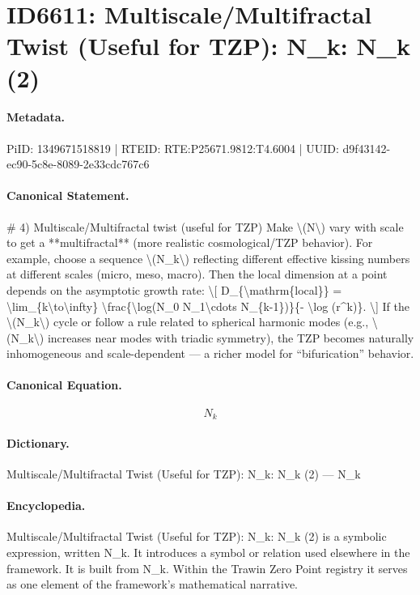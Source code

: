 \section*{ID6611: Multiscale/Multifractal Twist (Useful for TZP): N\_k: N\_k (2)}
\paragraph{Metadata.}
PiID: 1349671518819 | RTEID: RTE:P25671.9812:T4.6004 | UUID: d9f43142-ec90-5c8e-8089-2e33cdc767c6

\paragraph{Canonical Statement.}
\# 4) Multiscale/Multifractal twist (useful for TZP) Make \textbackslash{}(N\textbackslash{}) vary with scale to get a **multifractal** (more realistic cosmological/TZP behavior). For example, choose a sequence \textbackslash{}(N\_k\textbackslash{}) reflecting different effective kissing numbers at different scales (micro, meso, macro). Then the local dimension at a point depends on the asymptotic growth rate: \textbackslash{}[ D\_\{\textbackslash{}mathrm\{local\}\} = \textbackslash{}lim\_\{k\textbackslash{}to\textbackslash{}infty\} \textbackslash{}frac\{\textbackslash{}log(N\_0 N\_1\textbackslash{}cdots N\_\{k-1\})\}\{- \textbackslash{}log (r\textasciicircum{}k)\}. \textbackslash{}] If the \textbackslash{}(N\_k\textbackslash{}) cycle or follow a rule related to spherical harmonic modes (e.g., \textbackslash{}(N\_k\textbackslash{}) increases near modes with triadic symmetry), the TZP becomes naturally inhomogeneous and scale-dependent — a richer model for “bifurication” behavior.

\paragraph{Canonical Equation.}
\[
N_k
\]

\paragraph{Dictionary.}
Multiscale/Multifractal Twist (Useful for TZP): N\_k: N\_k (2) — N\_k

\paragraph{Encyclopedia.}
Multiscale/Multifractal Twist (Useful for TZP): N\_k: N\_k (2) is a symbolic expression, written N\_k. It introduces a symbol or relation used elsewhere in the framework. It is built from N\_k. Within the Trawin Zero Point registry it serves as one element of the framework's mathematical narrative.

